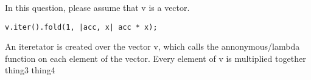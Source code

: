 %
%
In this question, please assume that v is a vector.
\begin{lstlisting}
v.iter().fold(1, |acc, x| acc * x);
\end{lstlisting}
  \choice An iteretator is created over the vector v, which calls the annonymous/lambda function on each element of the vector.
  \choice Every element of v is multiplied together
  \choice thing3
  \choice thing4
